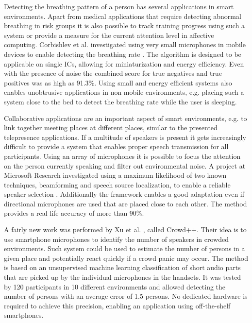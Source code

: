 Detecting the breathing pattern of a person has several applications in smart environments. Apart from medical applications that require detecting abnormal breathing in risk groups it is also possible to track training progress using such a system or provide a measure for the current attention level in affective computing. Corbishlev et al. investigated using very small microphones in mobile devices to enable detecting the breathing rate \cite{corbishley2008breathing}. The algorithm is designed to be applicable on single ICs, allowing for miniaturization and energy efficiency. Even with the presence of noise the combined score for true negatives and true positives was as high as 91.3\%. Using small and energy efficient systems also enables unobtrusive applications in non-mobile environments, e.g. placing such a system close to the bed to detect the breathing rate while the user is sleeping.

Collaborative applications are an important aspect of smart environments, e.g. to link together meeting places at different places, similar to the presented telepresence applications. If a multitude of speakers is present it gets increasingly difficult to provide a system that enables proper speech transmission for all participants. Using an array of microphones it is possible to focus the attention on the person currently speaking and filter out environmental noise. A project at Microsoft Research investigated using a maximum likelihood of two known techniques, beamforming and speech source localization, to enable a reliable speaker selection \cite{zhang2008maximum}. Additionally the framework enables a good adaptation even if directional microphones are used that are placed close to each other. The method provides a real life accuracy of more than 90\%.

A fairly new work was performed by Xu et al. \cite{xu2013crowd++}, called Crowd++. Their idea is to use smartphone microphones to identify the number of speakers in crowded environments. Such system could be used to estimate the number of persons in a given place and potentially react quickly if a crowd panic may occur. The method is based on an unsupervised machine learning classification of short audio parts that are picked up by the individual microphones in the handsets. It was tested by 120 participants in 10 different environments and allowed detecting the number of persons with an average error of 1.5 persons. No dedicated hardware is required to achieve this precision, enabling an application using off-the-shelf smartphones.

